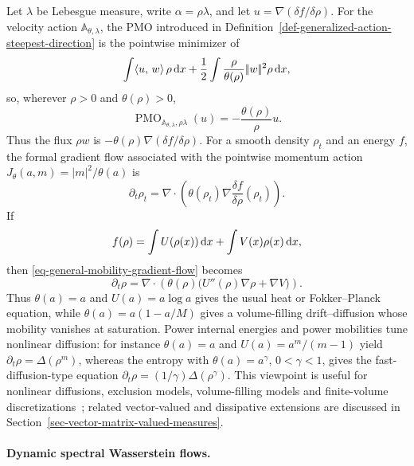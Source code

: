Let \(\lambda\) be Lebesgue measure, write \(\alpha=\rho\lambda\), and let \(u=\nabla(\delta f/\delta\rho)\). For the velocity action \(\mathbb A_{\theta,\lambda}\), the PMO introduced in Definition~\ref{def-generalized-action-steepest-direction} is the pointwise minimizer of
\[
\int \langle u,\,w\rangle\,\rho\,\mathrm{d} x
+
\frac12\int \frac{\rho}{\theta(\rho)}|\!| w |\!|^2\rho\,\mathrm{d} x,
\]
so, wherever \(\rho>0\) and \(\theta(\rho)>0\),
\begin{equation}\label{eq-concave-mobility-pmo}
\operatorname{PMO}_{\mathbb A_{\theta,\lambda},\rho\lambda}(u)
=
-\frac{\theta(\rho)}{\rho}u.
\end{equation}
Thus the flux \(\rho w\) is \(-\theta(\rho)\nabla(\delta f/\delta\rho)\). For a smooth density \(\rho_t\) and an energy \(f\), the formal gradient flow associated with the pointwise momentum action \(J_\theta(a,m)=|m|^2/\theta(a)\) is
\begin{equation}\label{eq-general-mobility-gradient-flow}
	\partial_t\rho_t
	=
		\nabla\!\cdot\!\left(\theta(\rho_t)\nabla\frac{\delta f}{\delta\rho}(\rho_t)\right).
\end{equation}
If
\[
	f(\rho)=\int U(\rho(x))\,\mathrm{d} x+\int V(x)\rho(x)\,\mathrm{d} x,
\]
then \eqref{eq-general-mobility-gradient-flow} becomes
\[
	\partial_t\rho
	=
	\nabla\!\cdot\!\left(\theta(\rho)\big(U''(\rho)\nabla\rho+\nabla V\big)\right).
\]
Thus \(\theta(a)=a\) and \(U(a)=a\log a\) gives the usual heat or Fokker--Planck equation, while \(\theta(a)=a(1-a/M)\) gives a volume-filling drift--diffusion whose mobility vanishes at saturation. Power internal energies and power mobilities tune nonlinear diffusion: for instance \(\theta(a)=a\) and \(U(a)=a^m/(m-1)\) yield \(\partial_t\rho=\Delta(\rho^m)\), whereas the entropy with \(\theta(a)=a^\gamma\), \(0<\gamma<1\), gives the fast-diffusion-type equation \(\partial_t\rho=(1/\gamma)\Delta(\rho^\gamma)\). This viewpoint is useful for nonlinear diffusions, exclusion models, volume-filling models and finite-volume discretizations~\cite{dolbeault2009new}; related vector-valued and dissipative extensions are discussed in Section~\ref{sec-vector-matrix-valued-measures}.

\paragraph{Dynamic spectral Wasserstein flows.}\label{sec-normalized-spectral-wasserstein-dynamics}

